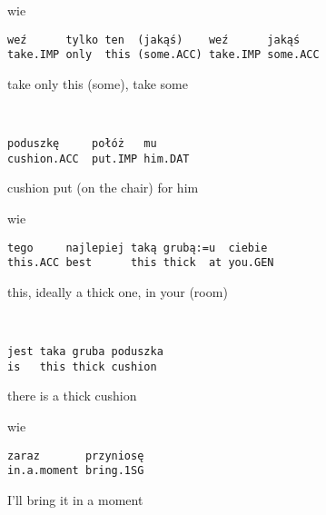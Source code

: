 \documentclass[output=paper]{langsci/langscibook}
\begin{document}
%
%
\begin{mdframednoverticalspace}[style=firstfoc]
\begin{transbox}{8}{wie}
\begin{verbatim}
weź      tylko ten  (jakąś)    weź      jakąś
take.IMP only  this (some.ACC) take.IMP some.ACC
\end{verbatim}
take only this (some), take some
\end{transbox}
\end{mdframednoverticalspace}
%
\begin{mdframednoverticalspace}[style=firstfoc]
\begin{transbox}{9}{~}
\begin{verbatim}
poduszkę     połóż   mu
cushion.ACC  put.IMP him.DAT
\end{verbatim}
cushion put (on the chair) for him
\end{transbox}
\end{mdframednoverticalspace}
%
%
\begin{mdframednoverticalspace}[style=firstfoc]
\begin{transbox}{11}{wie}
\begin{verbatim}
tego     najlepiej taką grubą:=u  ciebie
this.ACC best      this thick  at you.GEN
\end{verbatim}
this, ideally a thick one, in your (room)
\end{transbox}
\end{mdframednoverticalspace}
%
\begin{mdframednoverticalspace}[style=firstfoc]
\begin{transbox}{12}{~}
\begin{verbatim}
jest taka gruba poduszka
is   this thick cushion
\end{verbatim}
there is a thick cushion
\end{transbox}
\end{mdframednoverticalspace}
%
%
\begin{transbox}{14}{wie}
\begin{verbatim}
zaraz       przyniosę
in.a.moment bring.1SG
\end{verbatim}
I’ll bring it in a moment
\end{transbox}
%
%
\begin{mdframednoverticalspace}[style=secondfoc]
\end{mdframednoverticalspace}
\end{document}
